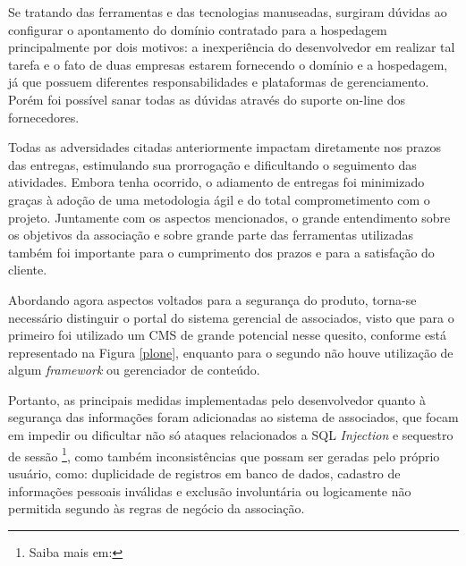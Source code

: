 Se tratando das ferramentas e das tecnologias manuseadas, surgiram dúvidas ao configurar o apontamento do domínio contratado para a hospedagem principalmente por dois motivos: a inexperiência do desenvolvedor em realizar tal tarefa e o fato de duas empresas estarem fornecendo o domínio e a hospedagem, já que possuem diferentes responsabilidades e plataformas de gerenciamento. Porém foi possível sanar todas as dúvidas através do suporte on-line dos fornecedores.

Todas as adversidades citadas anteriormente impactam diretamente nos prazos das entregas, estimulando sua prorrogação e dificultando o seguimento das atividades. Embora tenha ocorrido, o adiamento de entregas foi minimizado graças à adoção de uma metodologia ágil e do total comprometimento com o projeto. Juntamente com os aspectos mencionados, o grande entendimento sobre os objetivos da associação e sobre grande parte das ferramentas utilizadas também foi importante para o cumprimento dos prazos e para a satisfação do cliente.

Abordando agora aspectos voltados para a segurança do produto, torna-se necessário distinguir o portal do sistema gerencial de associados, visto que para o primeiro foi utilizado um CMS de grande potencial nesse quesito, conforme está representado na Figura \ref{plone}, enquanto para o segundo não houve utilização de algum \textit{framework} ou gerenciador de conteúdo. 

Portanto, as principais medidas implementadas pelo desenvolvedor quanto à segurança das informações foram adicionadas ao sistema de associados, que focam em impedir ou dificultar não só ataques relacionados a SQL \textit{Injection} e sequestro de sessão \footnote{Saiba mais em: }, como também inconsistências que possam ser geradas pelo próprio usuário, como: duplicidade de registros em banco de dados, cadastro de informações pessoais inválidas e exclusão involuntária ou logicamente não permitida segundo às regras de negócio da associação.

